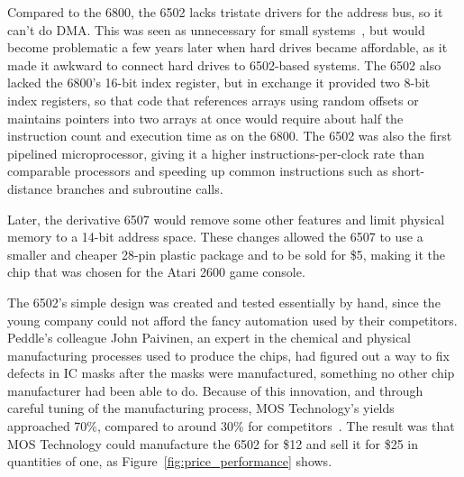 \begin{tangent}
    Compared to the 6800, the 6502 lacks
    tristate drivers for the address bus, so it can't do DMA.  This was seen as
    unnecessary for small systems~\cite{byte75:6502}, but would become
    problematic a few years later when hard drives became affordable, as
    it made it awkward to connect hard drives to 6502-based systems.
    The 6502 also lacked the 6800's 16-bit index register, but in exchange
    it provided two
     8-bit index registers, so that code that references arrays using
     random offsets or maintains pointers into two arrays at once would
     require about half the instruction count and execution time as on
     the 6800.
    The 6502 was also the first pipelined
    microprocessor, giving it a higher instructions-per-clock 
    rate than comparable processors and speeding up
    common instructions such as short-distance branches
     and subroutine calls.

    Later, the derivative 6507 would
    remove some other features and limit
    physical memory to a 14-bit address space.  These changes allowed
    the 6507 to
    use a smaller and cheaper 28-pin 
    plastic package and to be sold for \$5,
    making it the chip that was chosen for the Atari 2600 game console.
\end{tangent}

The 6502's simple design was created and tested essentially by hand,
since the young company could not afford the
fancy automation used by their competitors.
Peddle's colleague John Paivinen, an expert in the chemical
and physical manufacturing processes used to produce the chips, had
figured out a way to fix defects in IC masks after the masks were
manufactured, something no other chip manufacturer had been able to do.
Because of this innovation, and through careful tuning of the manufacturing process,
MOS Technology's yields approached 70\%,
compared to around 30\% for competitors~\cite{commodore}.
The result was that MOS Technology could manufacture the 6502 for \$12
and sell it for \$25 in  quantities of one, as
Figure~\ref{fig:price_performance} shows.

